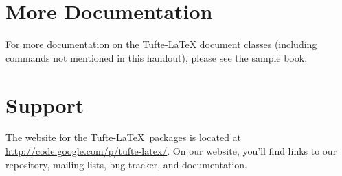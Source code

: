 \documentclass{tufte-handout}
\theoremstyle{definition}
\theoremstyle{example}
\theoremstyle{remark}
\begin{document}

\section{More Documentation}\label{sec:more-doc}
For more documentation on the Tufte-\LaTeX{} document classes (including
commands not mentioned in this handout), please see the sample book.

\section{Support}\label{sec:support}

The website for the Tufte-\LaTeX\ packages is located at
\url{http://code.google.com/p/tufte-latex/}. On our website, you'll find links
to our  repository, mailing lists, bug tracker, and
documentation.



\end{document}
